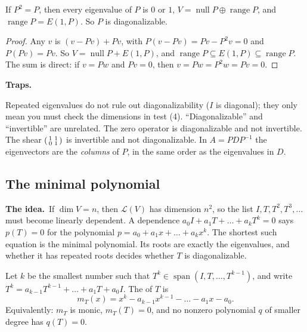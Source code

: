 \documentclass[10pt]{scrartcl}
\DeclareMathOperator{\nul}{null}
\DeclareMathOperator{\range}{range}
\DeclareMathOperator{\spn}{span}
\newcommand{\LL}{\mathcal L}
\newcommand{\traps}{\par\medskip\noindent\textbf{\color{RawSienna}Traps.}\ }
\newcommand{\idea}{\par\noindent\textbf{\color{MidnightBlue}The idea.}\ }
\begin{document}
\begin{proposition*}[HW6 P1: projections]
  If $P^2=P$, then every eigenvalue of $P$ is $0$ or $1$, $V=\nul P\oplus\range P$, and $\range P=E(1,P)$. So $P$ is diagonalizable.
\end{proposition*}
\begin{proof}
  Any $v$ is $(v-Pv)+Pv$, with $P(v-Pv)=Pv-P^2v=0$ and $P(Pv)=Pv$. So $V=\nul P+E(1,P)$, and $\range P\subseteq E(1,P)\subseteq\range P$. The sum is direct: if $v=Pw$ and $Pv=0$, then $v=Pw=P^2w=Pv=0$.
\end{proof}

\traps
\begin{itemize}
  \ii Repeated eigenvalues do not rule out diagonalizability ($I$ is diagonal); they only mean you must check the dimensions in test (4).
  \ii ``Diagonalizable'' and ``invertible'' are unrelated. The zero operator is diagonalizable and not invertible. The shear $\begin{psmallmatrix}1&1\\0&1\end{psmallmatrix}$ is invertible and not diagonalizable.
  \ii In $A=PDP^{-1}$ the eigenvectors are the \emph{columns} of $P$, in the same order as the eigenvalues in $D$.
\end{itemize}

\subsection{The minimal polynomial}\label{sec:minpoly}
\idea If $\dim V=n$, then $\LL(V)$ has dimension $n^2$, so the list $I,T,T^2,T^3,\dots$ must become linearly dependent. A dependence $a_0I+a_1T+\dots+a_kT^k=0$ says $p(T)=0$ for the polynomial $p=a_0+a_1x+\dots+a_kx^k$. The shortest such equation is the minimal polynomial. Its roots are exactly the eigenvalues, and whether it has repeated roots decides whether $T$ is diagonalizable.

\begin{definition*}
  Let $k$ be the smallest number such that $T^k\in\spn(I,T,\dots,T^{k-1})$, and write $T^k=a_{k-1}T^{k-1}+\dots+a_1T+a_0I$. The  of $T$ is
  \[ m_T(x)=x^k-a_{k-1}x^{k-1}-\dots-a_1x-a_0. \]
  Equivalently: $m_T$ is monic, $m_T(T)=0$, and no nonzero polynomial $q$ of smaller degree has $q(T)=0$.
\end{definition*}
\end{document}

